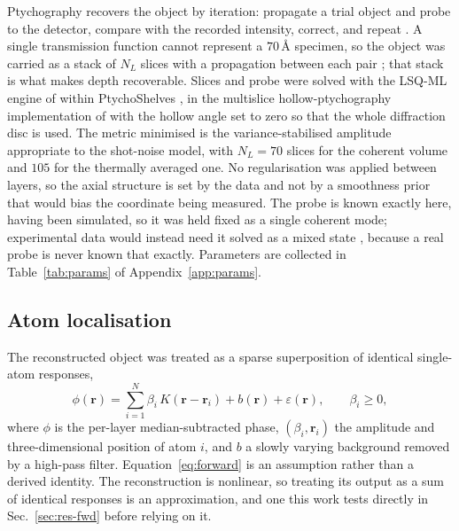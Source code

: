 \documentclass[aps,prb,twocolumn,superscriptaddress,floatfix,nofootinbib]{revtex4-2}
\begin{document}
Ptychography recovers the object by iteration: propagate a trial object and probe to the detector, compare with the recorded intensity, correct, and repeat \citep{RodenburgFaulkner2004}. A single transmission function cannot represent a $70$\,\AA{} specimen, so the object was carried as a stack of $N_L$ slices with a propagation between each pair \citep{Gao2017}; that stack is what makes depth recoverable. Slices and probe were solved with the LSQ-ML engine of \citet{Odstrcil2018} within PtychoShelves \citep{Wakonig2020}, in the multislice hollow-ptychography implementation of \citet{LeiWang2026} with the hollow angle set to zero so that the whole diffraction disc is used. The metric minimised is the variance-stabilised amplitude \citep{ThibaultGuizar2012} appropriate to the shot-noise model, with $N_L=70$ slices for the coherent volume and $105$ for the thermally averaged one. No regularisation was applied between layers, so the axial structure is set by the data and not by a smoothness prior that would bias the coordinate being measured. The probe is known exactly here, having been simulated, so it was held fixed as a single coherent mode; experimental data would instead need it solved as a mixed state \citep{ThibaultMenzel2013}, because a real probe is never known that exactly. Parameters are collected in Table~\ref{tab:params} of Appendix~\ref{app:params}.


\subsection{Atom localisation}
\label{sec:atomfind}

The reconstructed object was treated as a sparse superposition of identical single-atom responses,
\begin{equation}
  \phi(\mathbf{r}) = \sum_{i=1}^{N} \beta_i\, K(\mathbf{r}-\mathbf{r}_i) + b(\mathbf{r})
  + \varepsilon(\mathbf{r}), \qquad \beta_i \ge 0,
  \label{eq:forward}
\end{equation}
where $\phi$ is the per-layer median-subtracted phase, $(\beta_i,\mathbf{r}_i)$ the amplitude and three-dimensional position of atom $i$, and $b$ a slowly varying background removed by a high-pass filter. Equation~\eqref{eq:forward} is an assumption rather than a derived identity. The reconstruction is nonlinear, so treating its output as a sum of identical responses is an approximation, and one this work tests directly in Sec.~\ref{sec:res-fwd} before relying on it.
\end{document}

